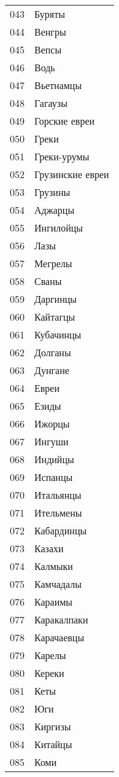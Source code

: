 \documentclass[10pt, a4paper, titlepage]{article}
\begin{document}
\begin{xtabular}{rp{.38\textwidth}}
    043 & Буряты \\
    044 & Венгры \\
    045 & Вепсы \\
    046 & Водь \\
    047 & Вьетнамцы \\
    048 & Гагаузы \\
    049 & Горские евреи \\
    050 & Греки \\
    051 & Греки-урумы \\
    052 & Грузинские евреи \\
    053 & Грузины \\
    054 & Аджарцы \\
    055 & Ингилойцы \\
    056 & Лазы \\
    057 & Мегрелы \\
    058 & Сваны \\
    059 & Даргинцы \\
    060 & Кайтагцы \\
    061 & Кубачинцы \\
    062 & Долганы \\
    063 & Дунгане \\
    064 & Евреи \\
    065 & Езиды \\
    066 & Ижорцы \\
    067 & Ингуши \\
    068 & Индийцы \\
    069 & Испанцы \\
    070 & Итальянцы \\
    071 & Ительмены \\
    072 & Кабардинцы \\
    073 & Казахи \\
    074 & Калмыки \\
    075 & Камчадалы \\
    076 & Караимы \\
    077 & Каракалпаки \\
    078 & Карачаевцы \\
    079 & Карелы \\
    080 & Кереки \\
    081 & Кеты \\
    082 & Юги \\
    083 & Киргизы \\
    084 & Китайцы \\
    085 & Коми \\

\end{xtabular}
\end{document}
